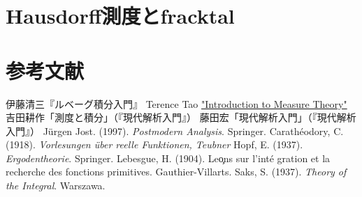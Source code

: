 \documentclass[uplatex, dvipdfmx]{jsreport}
\begin{document}
\chapter{Hausdorff測度とfracktal}

\chapter{参考文献}

\begin{thebibliography}{99}
    伊藤清三『ルベーグ積分入門』
    Terence Tao \href{https://terrytao.files.wordpress.com/2012/12/gsm-126-tao5-measure-book.pdf}{"Introduction to Measure Theory"}
    吉田耕作「測度と積分」（『現代解析入門』）
    藤田宏「現代解析入門」（『現代解析入門』）
    Jürgen Jost. (1997). \textit{Postmodern Analysis}. Springer.
    Carathéodory, C. (1918). \textit{Vorlesungen über reelle Funktionen, Teubner}
    Hopf, E. (1937). \textit{Ergodentheorie}. Springer.
    Lebesgue, H. (1904). Le\c ons sur l'int\'{e} gration et la recherche des fonctions primitives. Gauthier-Villarts.
    Saks, S. (1937). \textit{Theory of the Integral}. Warszawa.
\end{thebibliography}
\end{document}
